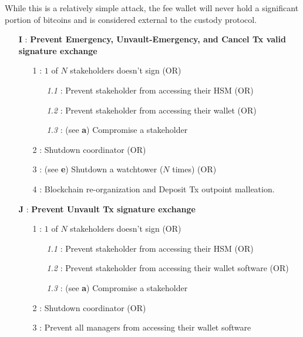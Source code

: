 \documentclass[runningheads]{llncs}
\begin{document}
\noindent While this is a relatively simple attack, the fee wallet will never hold a significant portion of bitcoins and is considered external to the custody protocol. 


{\footnotesize
\begin{itemize}[noitemsep,parsep=0pt,partopsep=0pt, leftmargin=0.7cm]
\item[\textbf{I} :] \textbf{Prevent Emergency, Unvault-Emergency, and Cancel Tx valid signature exchange}
\begin{itemize}[noitemsep,topsep=0pt,parsep=0pt,partopsep=0pt, leftmargin=0.8cm]
\item[1 :] $1$ of $N$ stakeholders doesn't sign (OR)
\begin{itemize}[noitemsep,topsep=0pt,parsep=0pt,partopsep=0pt, leftmargin=0.9cm]
\item[\textit{1.1} :] Prevent stakeholder from accessing their HSM (OR)
\item[\textit{1.2} :] Prevent stakeholder from accessing their wallet (OR)
\item[\textit{1.3} :] (see \textbf{a}) Compromise a stakeholder
\end{itemize}
\item[2 :] Shutdown coordinator (OR)
\item[3 :] (see \textbf{e}) Shutdown a watchtower ($N$ times) (OR)
\item[4 :] Blockchain re-organization and Deposit Tx outpoint malleation.
\end{itemize}
\end{itemize}
}

{\footnotesize
\begin{itemize}[noitemsep,parsep=0pt,partopsep=0pt, leftmargin=0.7cm]
\item[\textbf{J} :] \textbf{Prevent Unvault Tx signature exchange}
\begin{itemize}[noitemsep,topsep=0pt,parsep=0pt,partopsep=0pt, leftmargin=0.8cm]
\item[1 :] $1$ of $N$ stakeholders doesn't sign (OR)
\begin{itemize}[noitemsep,topsep=0pt,parsep=0pt,partopsep=0pt, leftmargin=0.9cm]
\item[\textit{1.1} :] Prevent stakeholder from accessing their HSM (OR)
\item[\textit{1.2} :] Prevent stakeholder from accessing their wallet software (OR)
\item[\textit{1.3} :] (see \textbf{a}) Compromise a stakeholder
\end{itemize}
\item[2 :] Shutdown coordinator (OR)
\item[3 :] Prevent all managers from accessing their wallet software
\end{itemize}
\end{itemize}
}
\end{document}
